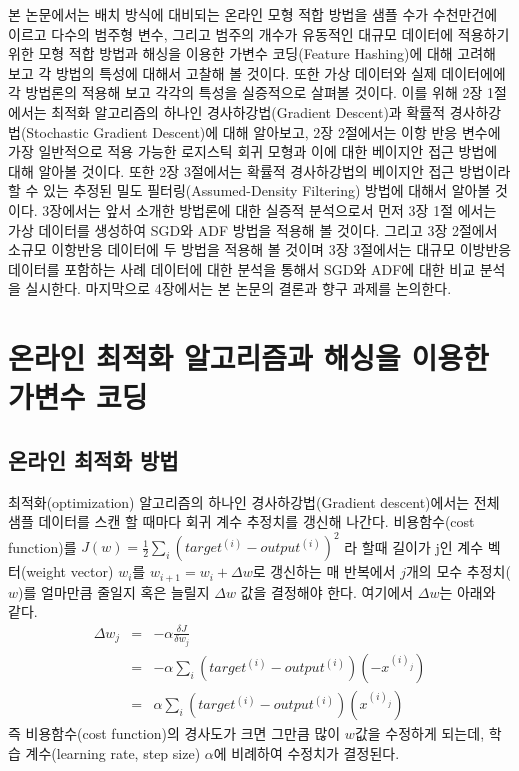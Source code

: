 \documentclass[oneside,b5paper,11pt]{book} %
\begin{document}
본 논문에서는 배치 방식에 대비되는 온라인 모형 적합 방법을 샘플 수가 수천만건에 이르고 다수의 범주형 변수, 그리고 범주의 개수가 유동적인 대규모 데이터에 적용하기 위한 모형 적합 방법과 해싱을 이용한 가변수 코딩(Feature Hashing)에 대해 고려해 보고 각 방법의 특성에 대해서 고찰해 볼 것이다. 또한 가상 데이터와 실제 데이터에에 각 방법론의 적용해 보고 각각의 특성을 실증적으로 살펴볼 것이다. 이를 위해 2장 1절에서는 최적화 알고리즘의 하나인 경사하강법(Gradient Descent)과 확률적 경사하강법(Stochastic Gradient Descent)에 대해 알아보고, 2장 2절에서는 이항 반응 변수에 가장 일반적으로 적용 가능한 로지스틱 회귀 모형과 이에 대한 베이지안 접근 방법에 대해 알아볼 것이다. 또한 2장 3절에서는 확률적 경사하강법의 베이지안 접근 방법이라 할 수 있는 추정된 밀도 필터링(Assumed-Density Filtering) 방법에 대해서 알아볼 것이다. 3장에서는 앞서 소개한 방법론에 대한 실증적 분석으로서 먼저 3장 1절 에서는 가상 데이터를 생성하여 SGD와 ADF 방법을 적용해 볼 것이다. 그리고 3장 2절에서 소규모 이항반응 데이터에 두 방법을 적용해 볼 것이며 3장 3절에서는 대규모 이방반응 데이터를 포함하는 사례 데이터에 대한 분석을 통해서 SGD와 ADF에 대한 비교 분석을 실시한다. 마지막으로 4장에서는 본 논문의 결론과 향구 과제를 논의한다.


 
%
\chapter{온라인 최적화 알고리즘과 해싱을 이용한 가변수 코딩}
 
\section{온라인 최적화 방법}
최적화(optimization) 알고리즘의 하나인 경사하강법(Gradient descent)에서는 전체 샘플 데이터를 스캔 할 때마다 회귀 계수 추정치를 갱신해 나간다. 비용함수(cost function)를 $J(w) = \frac{1}{2} \sum_{i}(target^{(i)} - output^{(i)})^{2}$ 라 할때 길이가 j인 계수 벡터(weight vector) $w_i$를 $w_{i+1}=w_{i}+\Delta w$로 갱신하는 매 반복에서 $j$개의 모수 추정치($w$)를 얼마만큼 줄일지 혹은 늘릴지 $\Delta w$ 값을 결정해야 한다. 여기에서 $\Delta w$는 아래와 같다.
\begin{eqnarray}
\Delta w_{j} 	&=& -\alpha \frac{\delta J}{\delta w_{j}} \\
							&=& -\alpha \sum_{i}(target^{(i)} - output^{(i)})(-x^{(i)_{j}}) \\
							&=& \alpha \sum_{i}(target^{(i)} - output^{(i)})(x^{(i)_{j}})
\end{eqnarray}
즉 비용함수(cost function)의 경사도가 크면 그만큼 많이 $w$값을 수정하게 되는데, 학습 계수(learning rate, step size) $\alpha$에 비례하여 수정치가 결정된다.
\end{document}
